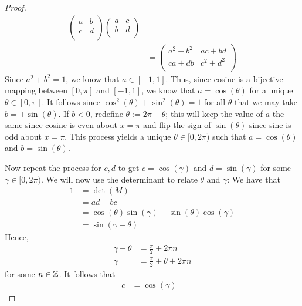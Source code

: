 \documentclass[../psets.tex]{subfiles}
\begin{document}
\begin{enumerate}
\begin{enumerate}
\begin{proof}
\begin{align*}
\begin{pmatrix}
                    a & b\\
                    c & d\\
                \end{pmatrix}
                \begin{pmatrix}
                    a & c\\
                    b & d\\
                \end{pmatrix}\\
                &=
                \begin{pmatrix}
                    a^2+b^2 & ac+bd\\
                    ca+db & c^2+d^2\\
                \end{pmatrix}
            \end{align*}
            Since $a^2+b^2=1$, we know that $a\in[-1,1]$. Thus, since cosine is a bijective mapping between $[0,\pi]$ and $[-1,1]$, we know that $a=\cos(\theta)$ for a unique $\theta\in[0,\pi]$. It follows since $\cos^2(\theta)+\sin^2(\theta)=1$ for all $\theta$ that we may take $b=\pm\sin(\theta)$. If $b<0$, redefine $\theta:=2\pi-\theta$; this will keep the value of $a$ the same since cosine is even about $x=\pi$ and flip the sign of $\sin(\theta)$ since sine is odd about $x=\pi$. This process yields a unique $\theta\in[0,2\pi)$ such that $a=\cos(\theta)$ and $b=\sin(\theta)$.\par
            Now repeat the process for $c,d$ to get $c=\cos(\gamma)$ and $d=\sin(\gamma)$ for some $\gamma\in[0,2\pi)$. We will now use the determinant to relate $\theta$ and $\gamma$: We have that
            \begin{align*}
                1 &= \det(M)\\
                &= ad-bc\\
                &= \cos(\theta)\sin(\gamma)-\sin(\theta)\cos(\gamma)\\
                &= \sin(\gamma-\theta)
            \end{align*}
            Hence,
            \begin{align*}
                \gamma-\theta &= \frac{\pi}{2}+2\pi n\\
                \gamma &= \frac{\pi}{2}+\theta+2\pi n
            \end{align*}
            for some $n\in\mathbb{Z}$. It follows that
            \begin{align*}
                c &= \cos(\gamma)&

\end{align*}
\end{proof}
\end{enumerate}
\end{enumerate}
\end{document}
